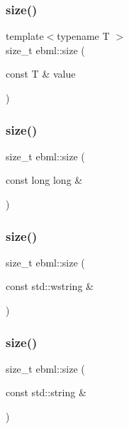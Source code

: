 \mbox{\label{namespaceebml_a0385005834de08a2401ec491023f9ab3}} 
\subsubsection{\texorpdfstring{size()}{size()}\hspace{0.1cm}{\footnotesize\ttfamily [2/6]}}
{\footnotesize\ttfamily template$<$typename T $>$ \\
size\+\_\+t ebml\+::size (\begin{DoxyParamCaption}\item[{const T \&}]{value }\end{DoxyParamCaption})}

\mbox{\label{namespaceebml_a54b33809097f683fb8345f9668e8237b}} 
\subsubsection{\texorpdfstring{size()}{size()}\hspace{0.1cm}{\footnotesize\ttfamily [3/6]}}
{\footnotesize\ttfamily size\+\_\+t ebml\+::size (\begin{DoxyParamCaption}\item[{const long long \&}]{ }\end{DoxyParamCaption})}

\mbox{\label{namespaceebml_ab52135bc5dd3c3195dfc839bc8b551fd}} 
\subsubsection{\texorpdfstring{size()}{size()}\hspace{0.1cm}{\footnotesize\ttfamily [4/6]}}
{\footnotesize\ttfamily size\+\_\+t ebml\+::size (\begin{DoxyParamCaption}\item[{const std\+::wstring \&}]{ }\end{DoxyParamCaption})}

\mbox{\label{namespaceebml_a75eaf24de9c90584c60e27de3b1dd63e}} 
\subsubsection{\texorpdfstring{size()}{size()}\hspace{0.1cm}{\footnotesize\ttfamily [5/6]}}
{\footnotesize\ttfamily size\+\_\+t ebml\+::size (\begin{DoxyParamCaption}\item[{const std\+::string \&}]{ }\end{DoxyParamCaption})}

